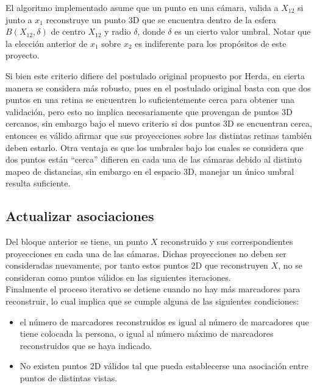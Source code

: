 El algoritmo implementado asume que un punto en una cámara, valida a $X_{12}$ si junto a $x_1$ reconstruye un punto 3D que se encuentra dentro de la esfera $B(X_{12}, \delta)$ de centro $X_{12}$ y radio $\delta$, donde $\delta$ es un cierto valor umbral. Notar que la elección anterior de $x_1$ sobre $x_2$ es indiferente para los propósitos de este proyecto. 


Si bien este criterio difiere del postulado original propuesto por Herda, en cierta manera se considera más robusto, pues en el postulado original basta con que dos puntos en una retina se encuentren lo suficientemente cerca para obtener una validación, pero esto no implica necesariamente que provengan de puntos 3D cercanos, sin embargo bajo el nuevo criterio si dos puntos 3D se encuentran cerca, entonces es válido afirmar que sus proyecciones sobre las distintas retinas también deben estarlo. Otra ventaja es que los umbrales bajo los cuales se considera que dos puntos están ``cerca'' difieren en cada una de las cámaras debido al distinto mapeo de distancias, sin embargo en el espacio 3D, manejar un único umbral resulta suficiente.       

\subsection{Actualizar asociaciones}\label{actualizar_asociaciones}

Del bloque anterior se tiene, un punto $X$ reconstruido y sus correspondientes proyecciones en cada una de las cámaras. Dichas proyecciones no deben ser consideradas nuevamente, por tanto estos puntos 2D que reconstruyen $X$, no se consideran como puntos válidos en las siguientes iteraciones.\\



Finalmente el proceso iterativo se detiene cuando no hay más marcadores para reconstruir, lo cual implica que se cumple alguna de las siguientes condiciones:\\
\begin{itemize}
\item el número de marcadores reconstruidos es igual al número de marcadores que tiene colocada la persona, o igual al número máximo de marcadores  reconstruidos que se haya indicado.

\item No existen puntos 2D válidos tal que pueda establecerse una asociación entre puntos de distintas vistas.
\end{itemize}




